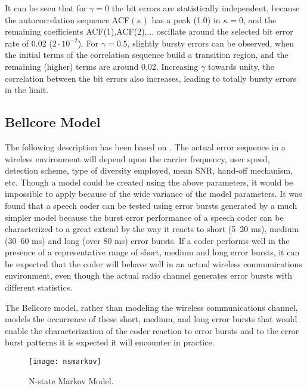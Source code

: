 It can be seen that for $\gamma=0$ the bit errors are statistically
independent, because the autocorrelation sequence ACF$(\kappa)$ has a peak
(1.0) in $\kappa=0$, and the remaining coefficients ACF(1),ACF(2),... oscillate
around the selected bit error rate of 0.02 ($2 \cdot 10^{-2}$). For
$\gamma=0.5$, slightly bursty errors can be observed, when the initial terms
of the correlation sequence build a transition region, and the remaining
(higher) terms are around 0.02. Increasing $\gamma$ towards unity, the
correlation between the bit errors also increases, leading to totally bursty
errors in the limit.\\

\subsection{Bellcore Model}

The following description has been based on \cite{Bellcore-Model-1}. The
actual error sequence in a wireless environment will depend upon the
carrier frequency, user speed, detection scheme, type of diversity
employed, mean SNR, hand-off mechanism, etc. Though a model could be
created using the above parameters, it would be impossible to apply
because of the wide variance of the model parameters. It was found that a
speech coder can be tested using error bursts generated by a much simpler
model because the burst error performance of a speech coder can be
characterized to a great extend by the way it reacts to short (5--20 ms),
medium (30--60 ms) and long (over 80 ms) error bursts. If a coder performs
well in the presence of a representative range of short, medium and long
error bursts, it can be expected that the coder will behave well in an
actual wireless communications environment, even though the actual radio
channel generates error bursts with different statistics.

The Bellcore model, rather than modeling the wireless communications channel,
models the occurrence of these short, medium, and long error bursts that would
enable the characterization of the coder reaction
to error bursts and to the error burst patterns it is expected it will
encounter in practice.

\begin{figure}[hb]
  \begin{center}
    \texttt{[image: nsmarkov]}
  \end{center}
  \caption{\label{N-state-Markov} N-state Markov Model.}
\end{figure}

